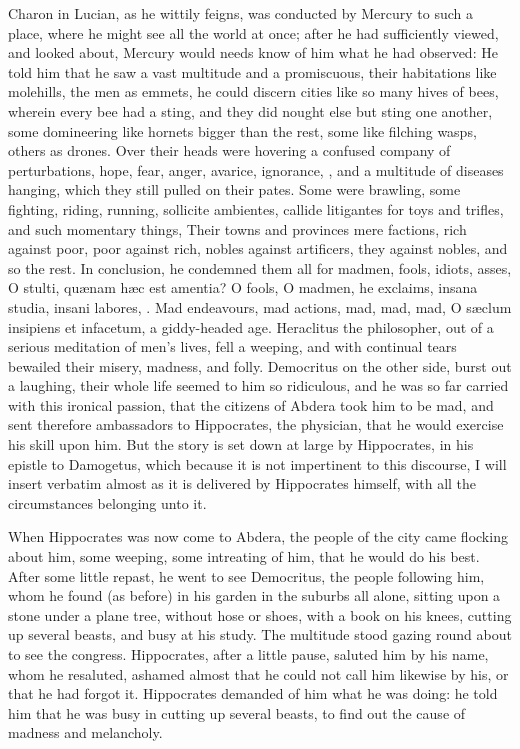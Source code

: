 {Charon in Lucian, as he wittily feigns, was conducted by Mercury
to such a place, where he might see all the world at once; after he had
sufficiently viewed, and looked about, Mercury would needs know of him
what he had observed: He told him that he saw a vast multitude and a
promiscuous, their habitations like molehills, the men as emmets, he
could discern cities like so many hives of bees, wherein every bee had
a sting, and they did nought else but sting one another, some
domineering like hornets bigger than the rest, some like filching
wasps, others as drones. Over their heads were hovering a confused
company of perturbations, hope, fear, anger, avarice, ignorance, \etc{},
and a multitude of diseases hanging, which they still pulled on their
pates. Some were brawling, some fighting, riding, running, sollicite
ambientes, callide litigantes for toys and trifles, and such momentary
things, Their towns and provinces mere factions, rich against poor,
poor against rich, nobles against artificers, they against nobles, and
so the rest. In conclusion, he condemned them all for madmen, fools,
idiots, asses, O stulti, qu\ae{}nam h\ae{}c est amentia? O fools, O madmen,
he exclaims, insana studia, insani labores, \etc{}. Mad endeavours, mad
actions, mad, mad, mad, O s\ae{}clum insipiens et infacetum, a
giddy-headed age. Heraclitus the philosopher, out of a serious
meditation of men's lives, fell a weeping, and with continual tears
bewailed their misery, madness, and folly. Democritus on the other
side, burst out a laughing, their whole life seemed to him so
ridiculous, and he was so far carried with this ironical passion, that
the citizens of Abdera took him to be mad, and sent therefore
ambassadors to Hippocrates, the physician, that he would exercise his
skill upon him. But the story is set down at large by Hippocrates, in
his epistle to Damogetus, which because it is not impertinent to this
discourse, I will insert verbatim almost as it is delivered by
Hippocrates himself, with all the circumstances belonging unto it.

When Hippocrates was now come to Abdera, the people of the city came
flocking about him, some weeping, some intreating of him, that he would
do his best. After some little repast, he went to see Democritus, the
people following him, whom he found (as before) in his garden in the
suburbs all alone, sitting upon a stone under a plane tree,
without hose or shoes, with a book on his knees, cutting up several
beasts, and busy at his study. The multitude stood gazing round about
to see the congress. Hippocrates, after a little pause, saluted him by
his name, whom he resaluted, ashamed almost that he could not call him
likewise by his, or that he had forgot it. Hippocrates demanded of him
what he was doing: he told him that he was busy in cutting up
several beasts, to find out the cause of madness and melancholy.

}
